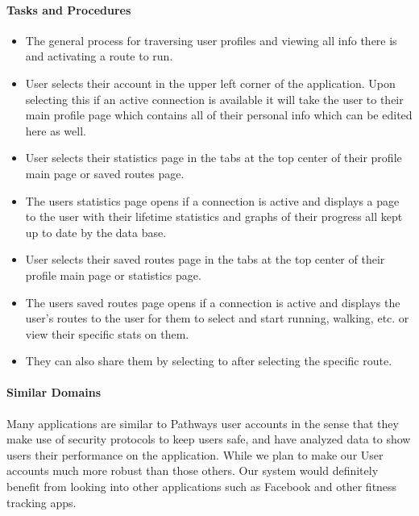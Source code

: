 ﻿\documentclass{article}
\begin{document}
\paragraph{Tasks and Procedures}
\begin{itemize}
    \item The general process for traversing user profiles and viewing all info there is and activating a route to run.
    \item User selects their account in the upper left corner of the application.
    \subitem Upon selecting this if an active connection is available it will take the user to their main profile page which contains all of their personal info which can be edited here as well.
    \item User selects their statistics page in the tabs at the top center of their profile main page or saved routes page.
    \item The users statistics page opens if a connection is active and displays a page to the user with their lifetime statistics and graphs of their progress all kept up to date by the data base.
    \item User selects their saved routes page in the tabs at the top center of their profile main page or statistics page.
    \item The users saved routes page opens if a connection is active and displays the user's routes to the user for them to select and start running, walking, etc. or view their specific stats on them.
    \item They can also share them by selecting to after selecting the specific route.
\end{itemize}

\paragraph{Similar Domains}
Many applications are similar to Pathways user accounts in the sense that they make use of security protocols to keep users safe, and have analyzed data to show users their performance on the application. While we plan to make our User accounts much more robust than those others. Our system would definitely benefit from looking into other applications such as Facebook and other fitness tracking apps.
\end{document}
